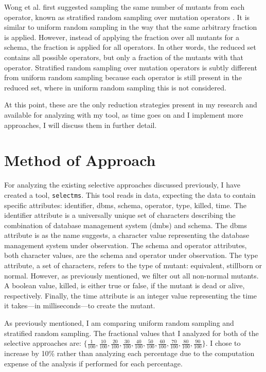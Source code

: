 \documentclass[conference]{IEEEtran}
\begin{document}
Wong et al. first suggested sampling the same number of mutants from each operator, known as
stratified random sampling over mutation operators \cite{wong1995reducing}. It is similar
to uniform random sampling in the way that the same arbitrary fraction is applied. However,
instead of applying the fraction over all mutants for a schema, the fraction is applied for all operators. In other
words, the reduced set contains all possible operators, but only a fraction of the mutants
with that operator. Stratified random sampling over mutation operators is subtly different
from uniform random sampling because each operator is still present in the reduced set, where
in uniform random sampling this is not considered.

At this point, these are the only reduction strategies present in my research and available for analyzing
with my tool, as time goes on and I implement more approaches, I will discuss them in further detail.

\section{Method of Approach}
For analyzing the existing selective approaches discussed previously, I have created
a tool, \texttt{selectms}. This tool reads in data, expecting the data to contain
specific attributes: identifier, dbms, schema, operator, type, killed, time. The identifier attribute
is a universally unique set of characters describing the combination of database management system (dmbs)
and schema. The dbms attribute is as the name suggests, a character value representing the database management system under observation.
The schema and operator attributes, both character values, are the schema and operator under observation. The type attribute, a set of characters,
refers to the type of mutant: equivalent, stillborn or normal. However, as previously mentioned, we filter out all non-normal mutants.
A boolean value, killed, is either true or false, if the mutant is dead or alive, respectively. Finally, the time attribute is an
integer value representing the time it takes---in milliseconds---to create the mutant.

As previously mentioned, I am comparing uniform random sampling and stratified random sampling.
The fractional values that I analyzed for both of the selective approaches are:
$\{\frac{1}{100}, \frac{10}{100}, \frac{20}{100}, \frac{30}{100}, \frac{40}{100}, \frac{50}{100}, \frac{60}{100}, \frac{70}{100}, \frac{80}{100}, \frac{90}{100}\}$.
I chose to increase by 10\% rather than analyzing each percentage due to the computation expense of the analysis if performed for each percentage.
\end{document}

